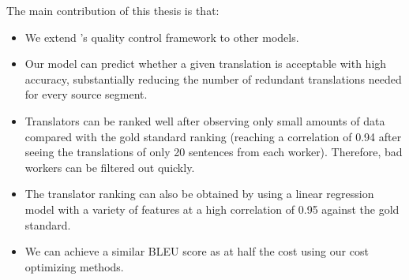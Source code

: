 The main contribution of this thesis is that:
 \begin{itemize}
 \item We extend 's quality control framework to other models.
 
 \item Our model can predict whether a given translation is acceptable with high accuracy, substantially reducing the number of redundant translations needed for every source segment.
 
\item Translators can be ranked well after observing only small amounts of data compared with the gold standard ranking (reaching a correlation of 0.94 after seeing the translations of only 20 sentences from each worker). Therefore, bad workers can be filtered out quickly. 
 
 \item The translator ranking can also be obtained by using a linear regression model with a variety of features at a high correlation of 0.95 against the gold standard. 
 
 
 \item We can achieve a similar BLEU score as  at half the cost using our cost optimizing methods.
 \end{itemize} 


 

